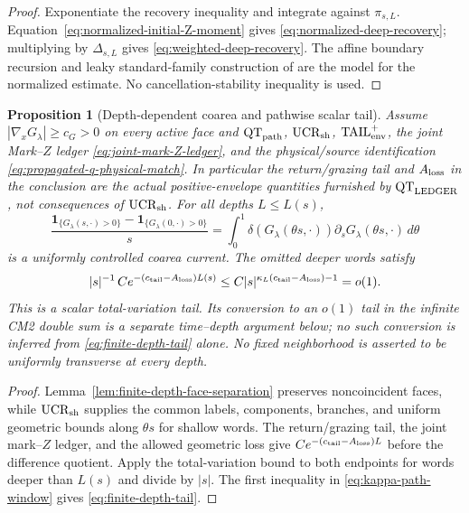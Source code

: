 \documentclass[11pt]{article}
\newtheorem{proposition}[theorem]{Proposition}
\newcommand{\one}{\mathbf 1}
\begin{document}
\begin{proof}
Exponentiate the recovery inequality and integrate against $\pi_{s,L}$.
Equation~\eqref{eq:normalized-initial-Z-moment} gives
\eqref{eq:normalized-deep-recovery}; multiplying by $\Delta_{s,L}$ gives
\eqref{eq:weighted-deep-recovery}.  The affine boundary recursion and leaky
standard-family construction of \cite{CanestrariHoles} are the model for
the normalized estimate.  No cancellation-stability inequality is used.
\end{proof}

\begin{proposition}[Depth-dependent coarea and pathwise scalar tail]
\label{prop:parameter-state-master-refinement}
Assume $|\nabla_xG_\lambda|\ge c_G>0$ on every active face and
$\mathrm{QT}_{\rm path}$, $\mathrm{UCR}_{\rm sh}$,
$\mathrm{TAIL}_{\rm env}^{+}$, the joint Mark--$Z$ ledger
\eqref{eq:joint-mark-Z-ledger}, and the physical/source identification
\eqref{eq:propagated-q-physical-match}.  In particular the return/grazing
tail and $A_{\rm loss}$ in the conclusion are the actual positive-envelope
quantities furnished by $\mathrm{QT}_{\rm LEDGER}$, not consequences of
$\mathrm{UCR}_{\rm sh}$.  For all depths
$L\le L(s)$,
\begin{equation}
\label{eq:master-coarea-difference}
 \frac{\one_{\{G_\lambda(s,\cdot)>0\}}
             -\one_{\{G_\lambda(0,\cdot)>0\}}}{s}
 =\int_0^1\delta(G_\lambda(\theta s,\cdot))
   \partial_sG_\lambda(\theta s,\cdot)\,d\theta
\end{equation}
is a uniformly controlled coarea current.  The omitted deeper words satisfy
\begin{equation}
\label{eq:finite-depth-tail}
 |s|^{-1}\,Ce^{-(c_{\rm tail}-A_{\rm loss})L(s)}
 \le C|s|^{\kappa_L(c_{\rm tail}-A_{\rm loss})-1}=o(1).
\end{equation}
This is a scalar total-variation tail.  Its conversion to an $o(1)$ tail in
the infinite CM2 double sum is a separate time--depth argument below; no such
conversion is inferred from \eqref{eq:finite-depth-tail} alone.  No fixed
neighborhood is asserted to be uniformly transverse at every depth.
\end{proposition}

\begin{proof}
Lemma~\ref{lem:finite-depth-face-separation} preserves noncoincident faces,
while $\mathrm{UCR}_{\rm sh}$ supplies the common labels, components, branches, and
uniform geometric bounds along $\theta s$ for shallow words.  The return/grazing tail,
the joint mark--$Z$ ledger, and the allowed geometric loss give
$Ce^{-(c_{\rm tail}-A_{\rm loss})L}$ before the difference quotient.  Apply
the total-variation bound to both endpoints for words deeper than $L(s)$ and
divide by $|s|$.  The first inequality in
\eqref{eq:kappa-path-window} gives \eqref{eq:finite-depth-tail}.
\end{proof}
\end{document}
